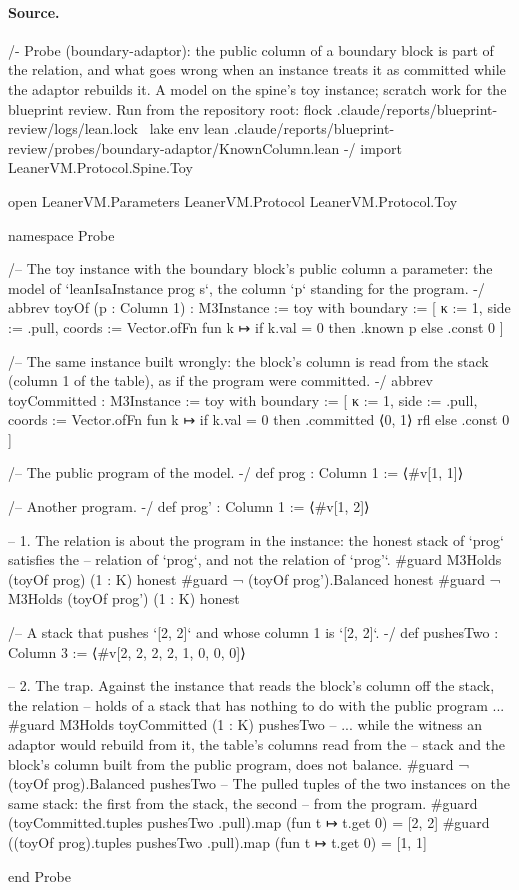 \paragraph{Source.}
\begin{leancode}[numbers=left,numbersep=3pt]
/-
  Probe (boundary-adaptor): the public column of a boundary block is part of the relation, and
  what goes wrong when an instance treats it as committed while the adaptor rebuilds it.
  A model on the spine's toy instance; scratch work for the blueprint review.
  Run from the repository root:
    flock .claude/reports/blueprint-review/logs/lean.lock \
      lake env lean .claude/reports/blueprint-review/probes/boundary-adaptor/KnownColumn.lean
-/
import LeanerVM.Protocol.Spine.Toy

open LeanerVM.Parameters LeanerVM.Protocol LeanerVM.Protocol.Toy

namespace Probe

/-- The toy instance with the boundary block's public column a parameter: the model of
`leanIsaInstance prog s`, the column `p` standing for the program. -/
abbrev toyOf (p : Column 1) : M3Instance :=
  { toy with
    boundary := [{ κ := 1, side := .pull,
                   coords := Vector.ofFn fun k ↦ if k.val = 0 then .known p else .const 0 }] }

/-- The same instance built wrongly: the block's column is read from the stack (column 1 of the
table), as if the program were committed. -/
abbrev toyCommitted : M3Instance :=
  { toy with
    boundary := [{ κ := 1, side := .pull,
                   coords := Vector.ofFn fun k ↦
                     if k.val = 0 then .committed ⟨0, 1⟩ rfl else .const 0 }] }

/-- The public program of the model. -/
def prog : Column 1 := ⟨#v[1, 1]⟩

/-- Another program. -/
def prog' : Column 1 := ⟨#v[1, 2]⟩

-- 1. The relation is about the program in the instance: the honest stack of `prog` satisfies the
-- relation of `prog`, and not the relation of `prog'`.
#guard M3Holds (toyOf prog) (1 : K) honest
#guard ¬ (toyOf prog').Balanced honest
#guard ¬ M3Holds (toyOf prog') (1 : K) honest

/-- A stack that pushes `[2, 2]` and whose column 1 is `[2, 2]`. -/
def pushesTwo : Column 3 := ⟨#v[2, 2, 2, 2, 1, 0, 0, 0]⟩

-- 2. The trap. Against the instance that reads the block's column off the stack, the relation
-- holds of a stack that has nothing to do with the public program ...
#guard M3Holds toyCommitted (1 : K) pushesTwo
-- ... while the witness an adaptor would rebuild from it, the table's columns read from the
-- stack and the block's column built from the public program, does not balance.
#guard ¬ (toyOf prog).Balanced pushesTwo
-- The pulled tuples of the two instances on the same stack: the first from the stack, the second
-- from the program.
#guard (toyCommitted.tuples pushesTwo .pull).map (fun t ↦ t.get 0) = [2, 2]
#guard ((toyOf prog).tuples pushesTwo .pull).map (fun t ↦ t.get 0) = [1, 1]

end Probe
\end{leancode}

